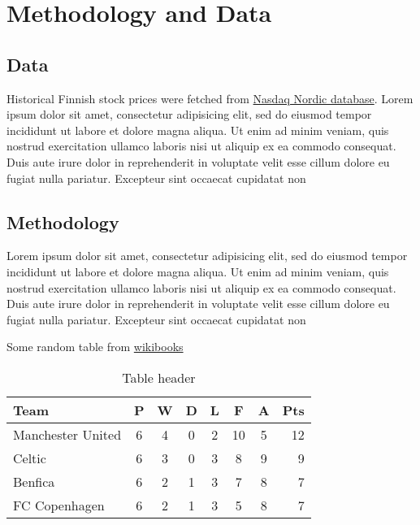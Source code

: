 \section{Methodology and Data}



\subsection{Data}

Historical Finnish stock prices were fetched from \href{http://www.nasdaqomxnordic.com/osakkeet/historiallisetkurssitiedot}{Nasdaq Nordic database}. Lorem ipsum dolor sit amet, consectetur adipisicing elit, sed do eiusmod
tempor incididunt ut labore et dolore magna aliqua. Ut enim ad minim veniam,
quis nostrud exercitation ullamco laboris nisi ut aliquip ex ea commodo
consequat. Duis aute irure dolor in reprehenderit in voluptate velit esse
cillum dolore eu fugiat nulla pariatur. Excepteur sint occaecat cupidatat non


\subsection{Methodology}

Lorem ipsum dolor sit amet, consectetur adipisicing elit, sed do eiusmod
tempor incididunt ut labore et dolore magna aliqua. Ut enim ad minim veniam,
quis nostrud exercitation ullamco laboris nisi ut aliquip ex ea commodo
consequat. Duis aute irure dolor in reprehenderit in voluptate velit esse
cillum dolore eu fugiat nulla pariatur. Excepteur sint occaecat cupidatat non
    
    Some random table from \href{https://en.wikibooks.org/wiki/LaTeX/Tables#Normal_LaTeX}{wikibooks}
    \begin{table}[h!]
        \caption{Table header }
        \centering
        \begin{tabular}{l*{6}{c}r}
            Team              & P & W & D & L & F  & A & Pts \\
            \hline
            Manchester United & 6 & 4 & 0 & 2 & 10 & 5 & 12  \\
            Celtic            & 6 & 3 & 0 & 3 &  8 & 9 &  9  \\
            Benfica           & 6 & 2 & 1 & 3 &  7 & 8 &  7  \\
            FC Copenhagen     & 6 & 2 & 1 & 3 &  5 & 8 &  7  \\
        \end{tabular}
    \end{table}
